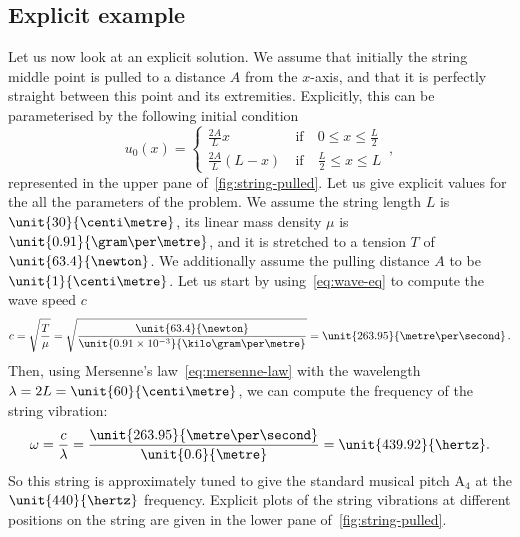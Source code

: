 \subsection{Explicit example}
Let us now look at an explicit solution. We assume that initially the string middle point
is pulled to a distance $A$ from the $x$-axis, and that it is perfectly straight between
this point and its extremities. Explicitly, this can be parameterised by the following
initial condition
\begin{equation}
	u_0(x)=
	\begin{cases}
		\frac{2A}{L}x     & ~\text{if}\quad 0\leq x \leq \frac{L}{2} \\
		\frac{2A}{L}(L-x) & ~\text{if}\quad \frac{L}{2}\leq x \leq L
	\end{cases}\,,
	\label{eq:string-pluck-ic}
\end{equation}
represented in the upper pane of~\cref{fig:string-pulled}. Let us give explicit values for
the all the parameters of the problem. We assume the string length $L$ is
$\unit{30}{\centi\metre}$, its linear mass density $\mu$ is
$\unit{0.91}{\gram\per\metre}$, and it is stretched to a tension $T$ of
$\unit{63.4}{\newton}$. We additionally assume the pulling distance $A$ to be
$\unit{1}{\centi\metre}$. Let us start by using~\cref{eq:wave-eq} to compute the wave
speed $c$
\begin{equation}
	c=\sqrt{\frac{T}{\mu}}
	=\sqrt{\frac{\unit{63.4}{\newton}}{\unit{0.91\times 10^{-3}}{\kilo\gram\per\metre}}}
	=\unit{263.95}{\metre\per\second}\,.
\end{equation}
Then, using Mersenne's law~\cref{eq:mersenne-law} with the wavelength
$\lambda=2L=\unit{60}{\centi\metre}$, we can compute the frequency of the string
vibration:
\begin{equation}
	\omega=\frac{c}{\lambda}=\frac{\unit{263.95}{\metre\per\second}}{\unit{0.6}{\metre}}
	=\unit{439.92}{\hertz}.
\end{equation}
So this string is approximately tuned to give the standard musical pitch $\mathrm{A}_4$ at
the $\unit{440}{\hertz}$ frequency. Explicit plots of the string vibrations at different
positions on the string are given in the lower pane of~\cref{fig:string-pulled}.
